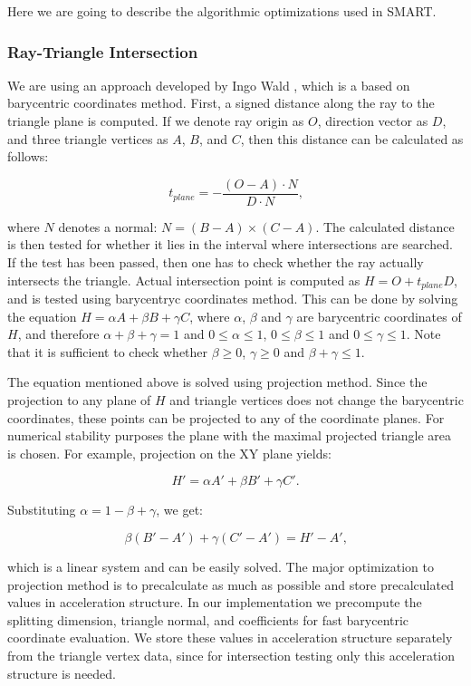 \documentclass{article}
\begin{document}
Here we are going to describe the algorithmic optimizations used in SMART.

\subsubsection{Ray-Triangle Intersection}
We are using an approach developed by Ingo Wald \cite{wald04}, which is a based on barycentric coordinates method. First, a signed distance along the ray to the triangle plane is computed. If we denote ray origin as $O$, direction vector as $D$, and three triangle vertices as $A$, $B$, and $C$, then this distance can be calculated as follows:

$$t_{plane} = - \frac{(O - A) \cdot N}{D \cdot N}\text{,}$$

where $N$ denotes a normal: $N = (B - A) \times (C - A)$. The calculated distance is then tested for whether it lies in the interval where intersections are searched. If the test has been passed, then one has to check whether the ray actually intersects the triangle. Actual intersection point is computed as $H = O + t_{plane} D$, and is tested using barycentryc coordinates method. This can be done by solving the equation $H = \alpha A + \beta B + \gamma C$, where $\alpha$, $\beta$ and $\gamma$ are barycentric coordinates of $H$, and therefore $\alpha + \beta + \gamma = 1$ and $0 \le \alpha \le 1$, $0 \le \beta \le 1$ and $0 \le \gamma \le 1$. Note that it is sufficient to check whether $\beta \ge 0$, $\gamma \ge 0$ and $\beta + \gamma \le 1$.

The equation mentioned above is solved using projection method. Since the projection to any plane of $H$ and triangle vertices does not change the barycentric coordinates, these points can be projected to any of the coordinate planes. For numerical stability purposes the plane with the maximal projected triangle area is chosen. For example, projection on the XY plane yields:

$$ H' = \alpha A' + \beta B' + \gamma C'\text{.}$$

Substituting $\alpha = 1 - \beta + \gamma$, we get:

$$\beta (B' - A') + \gamma (C' - A') = H' - A'\text{,}$$

which is a linear system and can be easily solved. The major optimization to projection method is to precalculate as much as possible and store precalculated values in acceleration structure. In our implementation we precompute the splitting dimension, triangle normal, and coefficients for fast barycentric coordinate evaluation. We store these values in acceleration structure separately from the triangle vertex data, since for intersection testing only this acceleration structure is needed.
\end{document}
